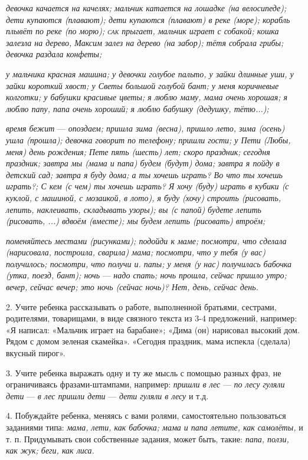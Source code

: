 \documentclass{book}
\renewcommand{\emph}[1]{\textit{#1}}
\begin{document}
\emph{девочка качается на качелях; мальчик катается на лошадке (на
велосипеде); дети купаются (плавают); дети купаются (плавают) в реке
(море); корабль плывёт по реке (по морю); \textsc{сак} прыгает, мальчик
играет с собакой; кошка залезла на дерево, Максим залез на дерево (на
забор); тётя собрала грибы; девочка раздала конфеты;}

\emph{у мальчика красная машина; у девочки голубое пальто, у зайки
длинные уши, у зайки короткий хвост; у Светы большой голубой бант; у
меня коричневые колготки; у бабушки красивые цветы; я люблю маму, мама
очень хорошая; я люблю папу, папа очень хороший; я люблю бабушку
(дедушку, тётю...);}

\emph{время бежит} --- \emph{опоздаем; пришла зима (весна), пришло лето,
зима (осень) ушла (прошла); девочка говорит по телефону; пришли гости; у
Пети (Любы, меня) день рождения; Пете пять (шесть) лет; скоро праздник;
сегодня праздник; завтра мы (мама и папа) будем (будут) дома; завтра я
пойду в детский сад; завтра я буду дома; а ты хочешь играть? Во что ты
хочешь играть?; С кем (с чем) ты хочешь играть? Я хочу (буду) играть в
кубики (с куклой, с машиной, с мозаикой, в лото), я буду (хочу) строить
(рисовать, лепить, наклеивать, складывать узоры); вы (с папой) будете
лепить (рисовать, ...) вдвоём (вместе); мы будем лепить (рисовать)
втроём;}

\emph{поменяйтесь местами (рисунками); подойди к маме; посмотри, что
сделала (нарисовала, построила, сварила) мама; посмотри,} \emph{что у
тебя (у вас) получилось; посмотри, что получи и. папы; у меня (у нас)
получилась бабочка (утка, поезд, бант); ночь} --- \emph{надо спать; ночь
прошла, сейчас пришло утро; вечер, сейчас вечер; это ночь (сейчас ночь)?
Нет, день, сейчас день.}

2. Учите ребенка рассказывать о работе, выполненной братьями, сестрами,
родителями, товарищами, в виде связного текста из 3-4 предложений,
например: «Я написал: «Мальчик играет на барабане»; «Дима (он) нарисовал
высокий дом. Рядом с домом зеленая скамейка». «Сегодня праздник, мама
испекла (сделала) вкусный пирог».

3. Учите ребенка выражать одну и ту же мысль с помощью разных фраз, не
ограничиваясь фразами-штампами, например: \emph{пришли в лес} ---
\emph{по лесу гуляли дети} --- \emph{в лес пришли дети} --- \emph{дети
гуляли в лесу} и т.д.

4. Побуждайте ребенка, меняясь с вами ролями, самостоятельно
пользоваться заданиями типа: \emph{мама, лети, как бабочка; мама и папа
летите, как самолёты,} и т. п. Придумывать свои собственные задания,
может быть, такие: \emph{папа, ползи, как жук; беги, как лиса.}
\end{document}
